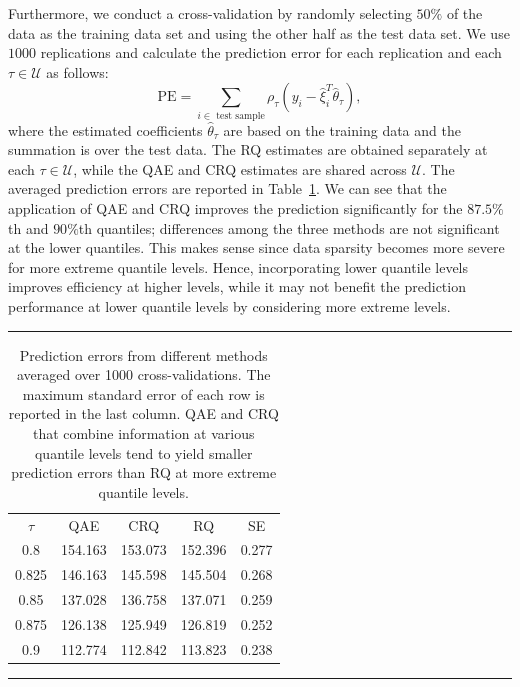 \documentclass[times,sort&compress,3p]{elsarticle}
\theoremstyle{plain}%
\theoremstyle{definition}
\newcommand{\btheta}{{\theta}}
\newcommand{\bxi}{{\xi}}
\begin{document}
Furthermore, we conduct a cross-validation by randomly selecting $50\%$ of the data as the training data set and using the other half as the test data set. We use $1000$ replications and calculate the prediction error for each replication and each $\tau \in \mathcal{U}$ as follows: 
\begin{equation}
\label{eq:bike.pe}
  \mathrm{PE} = \sum_{i \in \text{ test sample}} \rho_{\tau}(y_i -
  \widehat{\bxi}_{i}^T \widehat{{\btheta}}_{\tau}),
\end{equation}
where the estimated coefficients $\widehat{{\btheta}}_{\tau}$ are based on the training data and the summation is over the test data. The RQ estimates are obtained separately at each $\tau \in \mathcal{U}$, while the QAE and CRQ estimates are shared across $\mathcal{U}$. 
The averaged prediction errors are reported in Table~\ref{table:cv}. We can see that the application of QAE and CRQ improves the prediction significantly for the $87.5\%$th and $90\%$th quantiles; differences among the three methods are not significant at the lower quantiles. This makes sense since data sparsity becomes more severe for more extreme quantile levels. Hence, incorporating lower quantile levels improves efficiency at higher levels, while it may not benefit the prediction performance at lower quantile levels by considering more extreme levels. 



\begin{table}
\centering
\caption{Prediction errors from different methods averaged over 1000 cross-validations. The maximum standard error of each row is reported in the last column. QAE and CRQ that combine information at various quantile levels tend to yield smaller prediction errors than RQ at more extreme quantile levels. }
\label{table:cv} 
\hrule 
\begin{tabular}{ccccc}
 $\tau$ & QAE & CRQ & RQ & SE \\ 
0.8 & 154.163 & 153.073 & 152.396 & 0.277\\ 
  0.825 & 146.163 & 145.598 & 145.504 & 0.268\\ 
  0.85 & 137.028 & 136.758 & 137.071 & 0.259\\ 
  0.875 & 126.138 & 125.949 & 126.819 & 0.252\\ 
  0.9 & 112.774 & 112.842 & 113.823 & 0.238\\ 
\end{tabular} \hrule 
\end{table}
\end{document}
